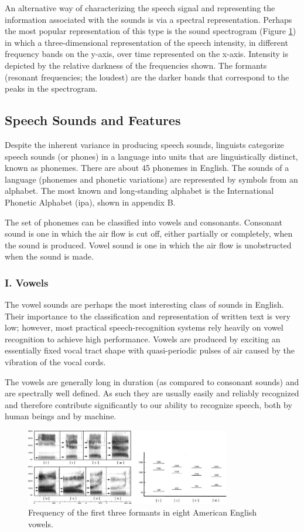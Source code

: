 \documentclass[12pt, a4paper, twoside]{report}
\begin{document}
An alternative way of characterizing the speech signal and representing the information associated with the sounds is via a spectral representation. Perhaps the most popular representation of this type is the sound spectrogram (Figure \ref{fig:freq-three-formants}) in which a three-dimensional representation of the speech intensity, in different frequency bands on the y-axis, over time represented on the x-axis. Intensity is depicted by the relative darkness of the frequencies shown. The formants (resonant frequencies; the loudest) are the darker bands that correspond to the peaks in the spectrogram.

\subsection{Speech Sounds and Features}
Despite the inherent variance in producing speech sounds, linguists categorize speech sounds (or phones) in a language into units that are linguistically distinct, known as phonemes. There are about 45 phonemes in English. The sounds of a language (phonemes and phonetic variations) are represented by symbols from an alphabet. The most known and long-standing alphabet is the International Phonetic Alphabet (\acrshort{ipa}), shown in appendix B.
\par
The set of phonemes can be classified into vowels and consonants. Consonant sound is one in which the air flow is cut off, either partially or completely, when the sound is produced. Vowel sound is one in which the air flow is unobstructed when the sound is made.
\subsubsection{I. Vowels}
The vowel sounds are perhaps the most interesting class of sounds in English. Their importance to the classification and representation of written text is very low; however, most practical speech-recognition systems rely heavily on vowel recognition to achieve high performance. Vowels are produced by exciting an essentially fixed vocal tract shape with quasi-periodic pulses of air caused by the vibration of the vocal cords.
\par
The vowels are generally long in duration (as compared to consonant sounds) and are spectrally well defined. As such they are usually easily and reliably recognized and therefore contribute significantly to our ability to recognize speech, both by human beings and by machine.

\begin{figure}[!h]
	\centering
	\includegraphics[width=0.8\textwidth]
	{images/chapter2/freq-three-formants}
	\caption{Frequency of the first three formants in eight American English vowels.}
	\label{fig:freq-three-formants}
\end{figure}
\end{document}
